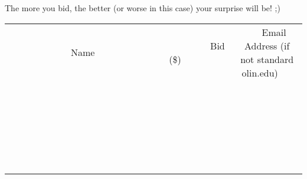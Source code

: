\documentclass[11pt]{article}
\begin{document}
The more you bid, the better (or worse in this case) your surprise will be! ;)
\\[6ex]
\begin{tabular}{c c c}
~~~~~~~~~~~~~Name~~~~~~~~~~~~~ & ~~~~~~~~~Bid (\$)~~~~~~~~~  & ~~~Email Address (if not standard olin.edu)~~~\\
 & & \\
\hline
 & & \\
\hline
 & & \\
\hline
 & & \\
\hline
 & & \\
\hline
 & & \\
\hline
 & & \\
\hline
 & & \\
\hline
 & & \\
\hline
 & & \\
\hline
 & & \\
\hline
 & & \\
\hline
 & & \\
\hline
 & & \\
\hline
 & & \\
\hline
 & & \\
\hline
 & & \\
\hline
 & & \\
\hline
 & & \\
\hline
 & & \\
\hline
 & & \\
\hline
 & & \\
\hline
 & & \\
\hline
 & & \\
\hline
 & & \\
\hline
 & & \\
\hline
\end{tabular}
\newpage
\end{document}
